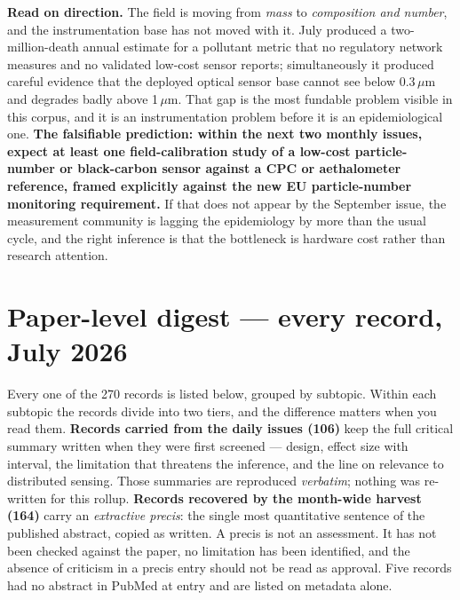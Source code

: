 \documentclass[10pt]{article}
\begin{document}
\vspace{3mm}

\footnotesize
\textbf{Read on direction.} The field is moving from \emph{mass} to \emph{composition and
number}, and the instrumentation base has not moved with it. July produced a
two-million-death annual estimate for a pollutant metric that no regulatory network
measures and no validated low-cost sensor reports; simultaneously it produced careful
evidence that the deployed optical sensor base cannot see below 0.3\,$\mu$m and degrades
badly above 1\,$\mu$m. That gap is the most fundable problem visible in this corpus, and
it is an instrumentation problem before it is an epidemiological one. \textbf{The
falsifiable prediction: within the next two monthly issues, expect at least one
field-calibration study of a low-cost particle-number or black-carbon sensor against a
CPC or aethalometer reference, framed explicitly against the new EU particle-number
monitoring requirement.} If that does not appear by the September issue, the
measurement community is lagging the epidemiology by more than the usual cycle, and the
right inference is that the bottleneck is hardware cost rather than research attention.

\clearpage

\section*{\sffamily\bfseries\color{Deep}Paper-level digest --- every record, July 2026}
\vspace{-1.5mm}{\color{Coral}\rule{\linewidth}{1.1pt}}\vspace{2.5mm}

\footnotesize
Every one of the 270 records is listed below, grouped by subtopic. Within each subtopic the
records divide into two tiers, and the difference matters when you read them.
\textbf{Records carried from the daily issues (106)} keep the full critical summary written
when they were first screened --- design, effect size with interval, the limitation that
threatens the inference, and the line on relevance to distributed sensing. Those summaries
are reproduced \emph{verbatim}; nothing was re-written for this rollup.
\textbf{Records recovered by the month-wide harvest (164)} carry an \emph{extractive
precis}: the single most quantitative sentence of the published abstract, copied as
written. A precis is not an assessment. It has not been checked against the paper, no
limitation has been identified, and the absence of criticism in a precis entry should not
be read as approval. Five records had no abstract in PubMed at entry and are listed on
metadata alone.
\end{document}
